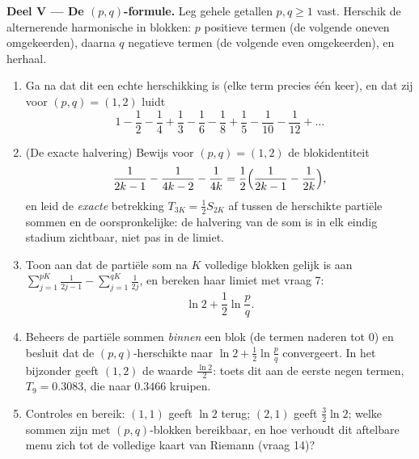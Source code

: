 \begin{problem}[{Weekendopgave --- $H_n = \ln n + \gamma +
\frac{1}{2n} + O(n^{-2})$, en het herschikken van $1 - \frac12 +
\frac13 - \dots$ tot $\frac{\ln 2}{2}$}]
\medskip
\noindent\textbf{Deel V --- De $(p, q)$-formule.} Leg gehele
getallen $p, q \geq 1$ vast. Herschik de alternerende harmonische
 in blokken: $p$ positieve termen (de volgende oneven
omgekeerden), daarna $q$ negatieve termen (de volgende even
omgekeerden), en herhaal.
\begin{enumerate}[resume]
  \item Ga na dat dit een echte herschikking is (elke term precies
        één keer), en dat zij voor $(p, q) = (1, 2)$ luidt
        \[
        1 - \frac12 - \frac14 + \frac13 - \frac16 - \frac18 +
        \frac15 - \frac1{10} - \frac1{12} + \dots
        \]
  \item (De exacte halvering) Bewijs voor $(p, q) = (1, 2)$ de
        blokidentiteit
        \[
        \frac{1}{2k-1} - \frac{1}{4k-2} - \frac{1}{4k}
        = \frac12\Bigl(\frac{1}{2k-1} - \frac{1}{2k}\Bigr),
        \]
        en leid de \emph{exacte} betrekking $T_{3K} = \frac12
        S_{2K}$ af tussen de herschikte partiële sommen en de
        oorspronkelijke: de halvering van de som is in elk eindig
        stadium zichtbaar, niet pas in de limiet.
  \item Toon aan dat de partiële som na $K$ volledige blokken
        gelijk is aan $\sum_{j=1}^{pK} \frac{1}{2j-1} -
        \sum_{j=1}^{qK} \frac{1}{2j}$, en bereken haar limiet met
        vraag 7:
        \[
        \ln 2 + \frac12 \ln\frac pq .
        \]
  \item Beheers de partiële sommen \emph{binnen} een blok (de
        termen naderen tot $0$) en besluit dat de $(p,
        q)$-herschikte  naar $\ln 2 + \frac12\ln \frac pq$
        convergeert. In het bijzonder geeft $(1, 2)$ de waarde
        $\frac{\ln 2}{2}$: toets dit aan de eerste negen termen,
        $T_9 = 0.3083$, die naar $0.3466$ kruipen.
  \item Controles en bereik: $(1,1)$ geeft $\ln 2$ terug; $(2,1)$
        geeft $\frac32\ln 2$; welke sommen zijn met
        $(p, q)$-blokken bereikbaar, en hoe verhoudt dit
        aftelbare menu zich tot de volledige kaart van Riemann
        (vraag 14)?
\end{enumerate}


\end{problem}
